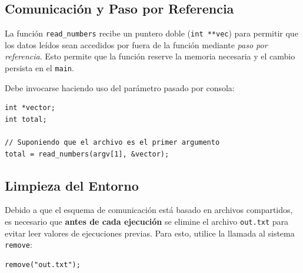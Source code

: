 \documentclass[12pt,a4paper]{article}
\begin{document}
\subsection*{Comunicación y Paso por Referencia}
La función \texttt{read\_numbers} recibe un puntero doble (\texttt{int **vec}) para permitir que los datos leídos sean accedidos por fuera de la función mediante \textit{paso por referencia}. Esto permite que la función reserve la memoria necesaria y el cambio persista en el \texttt{main}. 

Debe invocarse haciendo uso del parámetro pasado por consola:
\begin{lstlisting}
int *vector;
int total;

// Suponiendo que el archivo es el primer argumento
total = read_numbers(argv[1], &vector);
\end{lstlisting}

\subsection*{Limpieza del Entorno}
Debido a que el esquema de comunicación está basado en archivos compartidos, es necesario que \textbf{antes de cada ejecución} se elimine el archivo \texttt{out.txt} para evitar leer valores de ejecuciones previas. Para esto, utilice la llamada al sistema \texttt{remove}:
\begin{lstlisting}
remove("out.txt");
\end{lstlisting}
\end{document}
